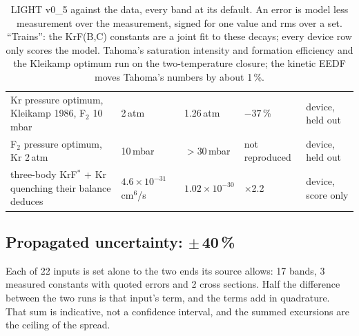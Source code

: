 \documentclass[11pt]{article}
\newcommand{\Ft}{F\ensuremath{_2}}
\newcommand{\x}{\ensuremath{\times}}
\newcommand{\unc}[1]{\colorbox{hlbg}{\textbf{#1}}}
\begin{document}
\begin{table}[H]
\begin{tabularx}{\textwidth}{@{}Xllll@{}}
\midrule
Kr pressure optimum, Kleikamp 1986, \Ft{} 10\,mbar & 2\,atm & 1.26\,atm & $-37$\,\% & device, held out \\
\Ft{} pressure optimum, Kr 2\,atm & 10\,mbar & $>30$\,mbar & not reproduced & device, held out \\
three-body KrF$^*$ + Kr quenching their balance deduces & $4.6\times10^{-31}$\,cm$^6$/s & $1.02\times10^{-30}$ & \x2.2 & device, score only \\
\bottomrule
\end{tabularx}
\caption{LIGHT v0\_5 against the data, every band at its default.
An error is model less measurement over the measurement, signed for one
value and rms over a set. ``Trains'': the KrF(B,C) constants are a joint
fit to these decays; every device row only scores the model. Tahoma's
saturation intensity and formation efficiency and the Kleikamp optimum run
on the two-temperature closure; the kinetic EEDF moves Tahoma's numbers by
about 1\,\%.}
\end{table}

\subsection{Propagated uncertainty: \unc{$\pm$\,40\,\%}}

Each of 22 inputs is set alone to the two ends its source allows: 17 bands,
3 measured constants with quoted errors and 2 cross sections. Half the
difference between the two runs is that input's term, and the terms add in
quadrature. That sum is indicative, not a confidence interval, and the
summed excursions are the ceiling of the spread.
\end{document}
